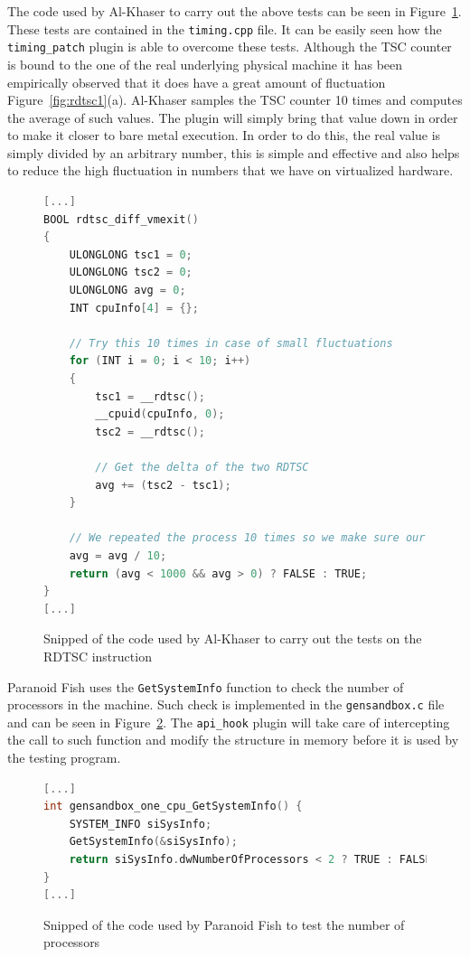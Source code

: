 The code used by Al-Khaser to carry out the above tests can be seen in Figure~\ref{fig:altest}. These tests are contained in the \lstinline{timing.cpp} file. It can be easily seen how the \lstinline{timing_patch} plugin is able to overcome these tests. Although the TSC counter is bound to the one of the real underlying physical machine it has been empirically observed that it does have a great amount of fluctuation Figure~\ref{fig:rdtsc1}(a). Al-Khaser samples the TSC counter 10 times and computes the average of such values. The plugin will simply bring that value down in order to make it closer to bare metal execution. In order to do this, the real value is simply divided by an arbitrary number, this is simple and effective and also helps to reduce the high fluctuation in numbers that we have on virtualized hardware.  

\begin{figure}[h!]
\centering
\begin{lstlisting}[language=C]
[...]
BOOL rdtsc_diff_vmexit()
{
	ULONGLONG tsc1 = 0;
	ULONGLONG tsc2 = 0;
	ULONGLONG avg = 0;
	INT cpuInfo[4] = {};

	// Try this 10 times in case of small fluctuations
	for (INT i = 0; i < 10; i++)
	{
		tsc1 = __rdtsc();
		__cpuid(cpuInfo, 0);
		tsc2 = __rdtsc();

		// Get the delta of the two RDTSC
		avg += (tsc2 - tsc1);
	}

	// We repeated the process 10 times so we make sure our check is as much reliable as we can
	avg = avg / 10;
	return (avg < 1000 && avg > 0) ? FALSE : TRUE;
}
[...]
\end{lstlisting}
\caption{Snipped of the code used by Al-Khaser to carry out the tests on the RDTSC instruction}
\label{fig:altest}
\end{figure}

Paranoid Fish uses the \lstinline{GetSystemInfo} function to check the number of processors in the machine. Such check is implemented in the \lstinline{gensandbox.c} file and can be seen in Figure~\ref{fig:patest}. The \lstinline{api_hook} plugin will take care of intercepting the call to such function and modify the structure in memory before it is used by the testing program. 

\begin{figure}[ht!]
\centering
\begin{lstlisting}[language=C]
[...]
int gensandbox_one_cpu_GetSystemInfo() {
	SYSTEM_INFO siSysInfo;
	GetSystemInfo(&siSysInfo);
	return siSysInfo.dwNumberOfProcessors < 2 ? TRUE : FALSE;
}
[...]
\end{lstlisting}
\caption{Snipped of the code used by Paranoid Fish to test the number of processors}
\label{fig:patest}
\end{figure}

